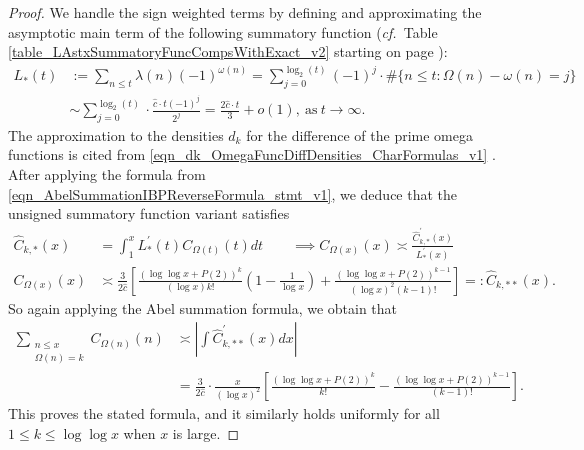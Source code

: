 \documentclass[11pt,reqno,a4letter]{article}
\numberwithin{figure}{section}
\numberwithin{table}{section}
\newcommand{\cf}{\textit{cf.\ }}
\theoremstyle{plain}
\numberwithin{theorem}{section}
\theoremstyle{definition}
\begin{document}
\begin{proof}
We handle the sign weighted terms by defining and approximating the asymptotic main term 
of the following summatory function 
(\cf Table \ref{table_LAstxSummatoryFuncCompsWithExact_v2} starting on page 
\pageref{table_LAstxSummatoryFuncCompsWithExact_v2}): 
\begin{align*} 
L_{\ast}(t) & := \sum_{n \leq t} \lambda(n) (-1)^{\omega(n)} = 
     \sum_{j=0}^{\log_2(t)} (-1)^{j} \cdot \#\{n \leq t: \Omega(n) - \omega(n) = j\} \\ 
     & \sim \sum_{j=0}^{\log_2(t)} \cdot \frac{\hat{c} \cdot t (-1)^{j}}{2^j} = 
     \frac{2\hat{c} \cdot t}{3} + o(1), \mathrm{\ as\ } t \rightarrow \infty. 
\end{align*} 
The approximation to the densities $d_k$ for the difference of the prime omega 
functions is cited from 
\eqref{eqn_dk_OmegaFuncDiffDensities_CharFormulas_v1} \cite[\S 2.4]{MV}. 
After applying the formula from \eqref{eqn_AbelSummationIBPReverseFormula_stmt_v1},  
we deduce that the unsigned summatory function variant satisfies 
\begin{align*} 
\widehat{C}_{k,\ast}(x) & = \int_1^{x} L_{\ast}^{\prime}(t) C_{\Omega(t)}(t) dt \qquad \implies 
C_{\Omega(x)}(x) \asymp \frac{\widehat{C}_{k,\ast}^{\prime}(x)}{L_{\ast}^{\prime}(x)} \\ 
C_{\Omega(x)}(x) & \asymp \frac{3}{2\hat{c}} \left[\frac{(\log\log x + P(2))^{k}}{(\log x) k!} \left(1 - 
     \frac{1}{\log x}\right) + \frac{(\log\log x + P(2))^{k-1}}{(\log x)^2 (k-1)!}\right] 
     =: \widehat{C}_{k,\ast\ast}(x). 
\end{align*} 
So again applying the Abel summation formula, we obtain that 
\begin{align*} 
\sum_{\substack{n \leq x \\ \Omega(n)=k}} C_{\Omega(n)}(n) & \asymp 
     \left\lvert \int \widehat{C}_{k,\ast\ast}^{\prime}(x) dx \right\rvert \\ 
     & = \frac{3}{2\hat{c}} \cdot \frac{x}{(\log x)^2} \left[ 
     \frac{(\log\log x + P(2))^{k}}{k!} - \frac{(\log\log x + P(2))^{k-1}}{(k-1)!}
     \right]. 
\end{align*} 
This proves the stated formula, and it similarly holds uniformly for all $1 \leq k \leq \log\log x$ 
when $x$ is large. 
\end{proof} 
\end{document}
